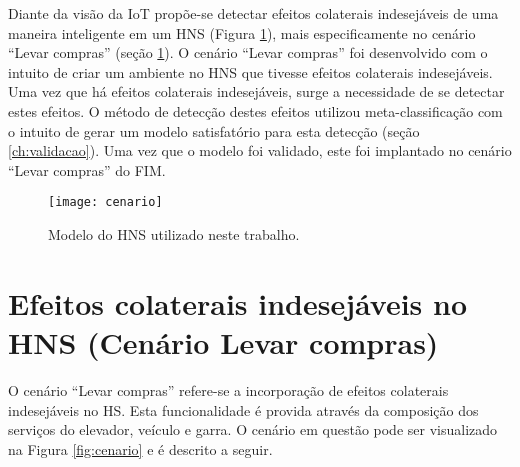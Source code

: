 Diante da visão da IoT propõe-se detectar efeitos colaterais indesejáveis de uma maneira inteligente em um HNS (Figura \ref{fig:hnsworkmodel}), mais especificamente no cenário ``Levar compras'' (seção \ref{sec:cenario}). O cenário ``Levar compras'' foi desenvolvido com o intuito de criar um ambiente no HNS que tivesse efeitos colaterais indesejáveis. Uma vez que há efeitos colaterais indesejáveis, surge a necessidade de se detectar estes efeitos. O método de detecção destes efeitos utilizou meta-classificação com o intuito de gerar um modelo satisfatório para esta detecção (seção \ref{ch:validacao}). Uma vez que o modelo foi validado, este foi implantado no cenário ``Levar compras'' do FIM.

\begin{figure}[!htb] \centering 
  \centering
  \texttt{[image: cenario]} 
  \caption{Modelo do HNS utilizado neste trabalho.} 
  \label{fig:hnsworkmodel}
\end{figure}

\section{Efeitos colaterais indesejáveis no HNS (Cenário Levar compras)}
\label{sec:cenario}
O cenário ``Levar compras'' refere-se a incorporação de efeitos colaterais indesejáveis no HS. Esta funcionalidade é provida através da composição dos serviços do elevador, veículo e garra. O cenário em questão pode ser visualizado na Figura \ref{fig:cenario} e é descrito a seguir.

